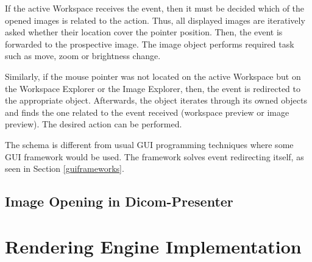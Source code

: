 If the active Workspace receives the event, then it must be decided which of the opened images is related to the action. Thus, all displayed images are iteratively asked whether their location cover the pointer position. Then, the event is forwarded to the prospective image. The image object performs required task such as move, zoom or brightness change.

Similarly, if the mouse pointer was not located on the active Workspace but on the Workspace Explorer or the Image Explorer, then, the event is redirected to the appropriate object. Afterwards, the object iterates through its owned objects and finds the one related to the event received (workspace preview or image preview). The desired action can be performed.

The schema is different from usual GUI programming techniques where some GUI framework would be used. The framework solves event redirecting itself, as seen in Section \ref{guiframeworks}.

\subsection{Image Opening in Dicom-Presenter}





\section{Rendering Engine Implementation}
